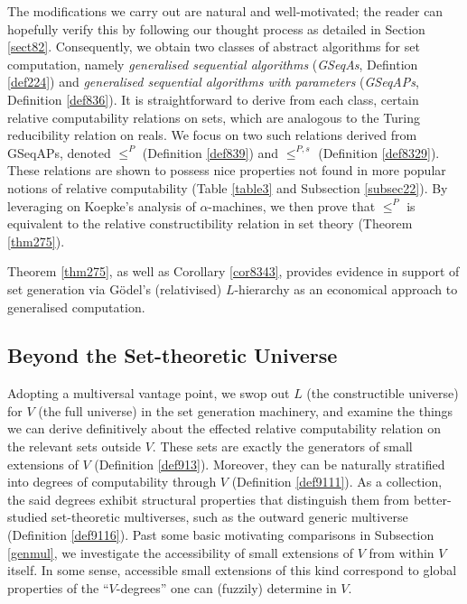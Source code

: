 \documentclass[12pt, twoside]{memoir}
\numberwithin{equation}{section}
\theoremstyle{definition}
\theoremstyle{remark}
\theoremstyle{definition}
\theoremstyle{definition}
\theoremstyle{definition}
\theoremstyle{remark}
\begin{document}
The modifications we carry out are natural and well-motivated; the reader can hopefully verify this by following our thought process as detailed in Section \ref{sect82}. Consequently, we obtain two classes of abstract algorithms for set computation, namely \textit{generalised sequential algorithms} (\textit{GSeqAs}, Defintion \ref{def224}) and \textit{generalised sequential algorithms with parameters} (\textit{GSeqAPs}, Definition \ref{def836}). It is straightforward to derive from each class, certain relative computability relations on sets, which are analogous to the Turing reducibility relation on reals. We focus on two such relations derived from GSeqAPs, denoted $\leq^P$ (Definition \ref{def839}) and $\leq^{P, s}$ (Definition \ref{def8329}). These relations are shown to possess nice properties not found in more popular notions of relative computability (Table \ref{table3} and Subsection \ref{subsec22}). By leveraging on Koepke's analysis of $\alpha$-machines, we then prove that $\leq^P$ is equivalent to the relative constructibility relation in set theory (Theorem \ref{thm275}). 

Theorem \ref{thm275}, as well as Corollary \ref{cor8343}, provides evidence in support of set generation via G\"{o}del's (relativised) $L$-hierarchy as an economical approach to generalised computation.

\subsection*{Beyond the Set-theoretic Universe}

Adopting a multiversal vantage point, we swop out $L$ (the constructible universe) for $V$ (the full universe) in the set generation machinery, and examine the things we can derive definitively about the effected relative computability relation on the relevant sets outside $V$. These sets are exactly the generators of small extensions of $V$ (Definition \ref{def913}). Moreover, they can be naturally stratified into degrees of computability through $V$ (Definition \ref{def9111}). As a collection, the said degrees exhibit structural properties that distinguish them from better-studied set-theoretic multiverses, such as the outward generic multiverse (Definition \ref{def9116}). Past some basic motivating comparisons in Subsection \ref{genmul}, we investigate the accessibility of small extensions of $V$ from within $V$ itself. In some sense, accessible small extensions of this kind correspond to global properties of the ``$V$-degrees'' one can (fuzzily) determine in $V$.
\end{document}
